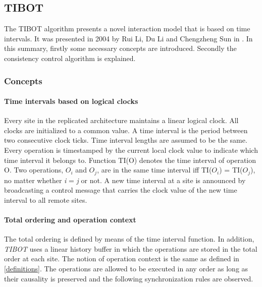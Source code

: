 \subsection{TIBOT}
\label{algo:tibot}

The TIBOT algorithm presents a novel interaction model that is based on time intervals. It was presented in 2004 by Rui Li, Du Li and Chengzheng Sun in \cite{tibot}. In this summary, firstly some necessary concepts are introduced. Secondly the consistency control algorithm is explained.
\subsubsection{Concepts}
\paragraph{Time intervals based on logical clocks}
Every site in the replicated architecture maintains a linear logical clock. All clocks are initialized to a common value. A time interval is the period between two consecutive clock ticks. Time interval lengths are assumed to be the same. Every operation is timestamped by the current local clock value to indicate which time interval it belongs to. Function TI(O) denotes the time interval of operation O. Two operations, $O_{i}$ and $O_{j}$, are in the same time interval iff TI($O_{i}$) = TI($O_{j}$), no matter whether \emph{i} = \emph{j} or not. A new time interval at a site is announced by broadcasting a control message that carries the clock value of the new time interval to all remote sites.

\paragraph{Total ordering and operation context}
The total ordering is defined by means of the time interval function.  In addition, \emph{TIBOT} uses a linear history buffer in which the operations are stored in the total order at each site. The notion of operation context is the same as defined in \ref{definitions}. The operations are allowed to be executed in any order as long as their causality is preserved and the following synchronization rules are observed.

